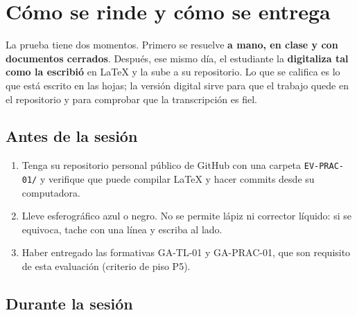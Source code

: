 \documentclass[11pt]{article}
\newcommand{\seccion}[1]{\section{\textcolor{utegreendk}{#1}}}
\newcommand{\subseccion}[1]{\subsection{\textcolor{midblue}{#1}}}
\begin{document}

\seccion{Cómo se rinde y cómo se entrega}




La prueba tiene dos momentos. Primero se resuelve \textbf{a mano, en clase y con documentos cerrados}. Después, ese mismo día, el estudiante la \textbf{digitaliza tal como la escribió} en \LaTeX{} y la sube a su repositorio. Lo que se califica es lo que está escrito en las hojas; la versión digital sirve para que el trabajo quede en el repositorio y para comprobar que la transcripción es fiel.



\subseccion{Antes de la sesión}



\begin{enumerate}[leftmargin=18pt,itemsep=2pt]

	\item Tenga su repositorio personal público de GitHub con una carpeta \texttt{EV-PRAC-01/} y verifique que puede compilar \LaTeX{} y hacer commits desde su computadora.

	\item Lleve esferográfico azul o negro. No se permite lápiz ni corrector líquido: si se equivoca, tache con una línea y escriba al lado.

	\item Haber entregado las formativas GA-TL-01 y GA-PRAC-01, que son requisito de esta evaluación (criterio de piso P5).

\end{enumerate}



\subseccion{Durante la sesión}
\end{document}
